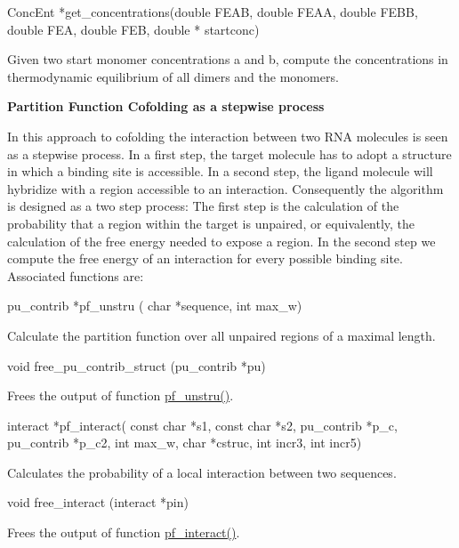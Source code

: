 \begin{DoxyVerb}
ConcEnt *get_concentrations(double FEAB,
                            double FEAA,
                            double FEBB,
                            double FEA,
                            double FEB,
                            double * startconc)
\end{DoxyVerb}
 Given two start monomer concentrations a and b, compute the concentrations in thermodynamic equilibrium of all dimers and the monomers. 

{\bfseries Partition Function Cofolding as a stepwise process}

In this approach to cofolding the interaction between two RNA molecules is seen as a stepwise process. In a first step, the target molecule has to adopt a structure in which a binding site is accessible. In a second step, the ligand molecule will hybridize with a region accessible to an interaction. Consequently the algorithm is designed as a two step process: The first step is the calculation of the probability that a region within the target is unpaired, or equivalently, the calculation of the free energy needed to expose a region. In the second step we compute the free energy of an interaction for every possible binding site. Associated functions are:

\begin{DoxyVerb}
pu_contrib *pf_unstru ( char *sequence,
                        int max_w)
\end{DoxyVerb}
 Calculate the partition function over all unpaired regions of a maximal length. 

\begin{DoxyVerb}
void  free_pu_contrib_struct (pu_contrib *pu)
\end{DoxyVerb}
 Frees the output of function \hyperlink{part__func__up_8h_a5b4ee40e190d2f633cd01cf0d2fe93cf}{pf\_\-unstru()}. 

\begin{DoxyVerb}
interact *pf_interact(
              const char *s1,
              const char *s2,
              pu_contrib *p_c,
              pu_contrib *p_c2,
              int max_w,
              char *cstruc,
              int incr3,
              int incr5)
\end{DoxyVerb}
 Calculates the probability of a local interaction between two sequences. 

\begin{DoxyVerb}
void free_interact (interact *pin)
\end{DoxyVerb}
 Frees the output of function \hyperlink{part__func__up_8h_a1aa0aa02bc3a724f87360c03097afd00}{pf\_\-interact()}. 

